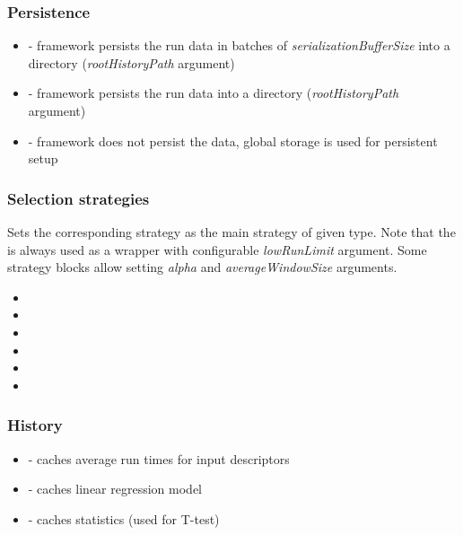 \documentclass[12pt,a4paper]{report}
\let\openright=\clearpage
\begin{document}
\subsubsection{Persistence}
\begin{itemize}
	\item {} - framework persists the run data in batches of \textit{serializationBufferSize} into a directory (\textit{rootHistoryPath} argument)
	\item {} - framework persists the run data into a directory (\textit{rootHistoryPath} argument)
	\item {} - framework does not persist the data, global storage is used for persistent setup
\end{itemize}

\subsubsection{Selection strategies}
Sets the corresponding strategy as the main strategy of given type. Note that the  is always used as a wrapper with configurable \textit{lowRunLimit} argument. Some strategy blocks allow setting \textit{alpha} and \textit{averageWindowSize} arguments.
\begin{itemize}
	\item {}
	\item {}
	\item {}	
	\item {}
	\item {}
	\item {}
\end{itemize}

\subsubsection{History}
\begin{itemize}
	\item {} - caches average run times for input descriptors
	\item {} - caches linear regression model
	\item {} - caches statistics (used for T-test)
\end{itemize}

\openright
\end{document}
